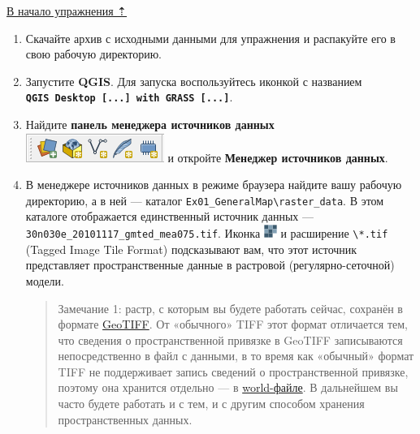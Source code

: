 \documentclass[
  12pt,
]{book}
\begin{document}
\protect\hyperlink{map-design-general}{В начало упражнения ⇡}

\begin{enumerate}
\def\labelenumi{\arabic{enumi}.}
\item
  Скачайте архив с исходными данными для упражнения и распакуйте его в свою рабочую директорию.
\item
  Запустите \textbf{QGIS}. Для запуска воспользуйтесь иконкой с названием \textbf{\texttt{QGIS\ Desktop\ {[}...{]}\ with\ GRASS\ {[}...{]}}}.
\item
  Найдите \textbf{панель менеджера источников данных} \includegraphics{images/Ex01/pic01.png} и откройте \textbf{Менеджер источников данных}.
\item
  В менеджере источников данных в режиме браузера найдите вашу рабочую директорию, а в ней --- каталог \texttt{Ex01\_GeneralMap\textbackslash{}raster\_data}. В этом каталоге отображается единственный источник данных --- \texttt{30n030e\_20101117\_gmted\_mea075.tif}. Иконка \includegraphics{images/Ex01/raster.png} и расширение \texttt{\textbackslash{}*.tif} (Tagged Image Tile Format) подсказывают вам, что этот источник представляет пространственные данные в растровой (регулярно-сеточной) модели.

  \begin{quote}
  Замечание 1: растр, с которым вы будете работать сейчас, сохранён в формате \href{https://www.opengeospatial.org/standards/geotiff}{GeoTIFF}. От «обычного» TIFF этот формат отличается тем, что сведения о пространственной привязке в GeoTIFF записываются непосредственно в файл с данными, в то время как «обычный» формат TIFF не поддерживает запись сведений о пространственной привязке, поэтому она хранится отдельно --- в \href{https://en.wikipedia.org/wiki/World_file}{world-файле}. В дальнейшем вы часто будете работать и с тем, и с другим способом хранения пространственных данных.
  \end{quote}


\end{enumerate}
\end{document}
